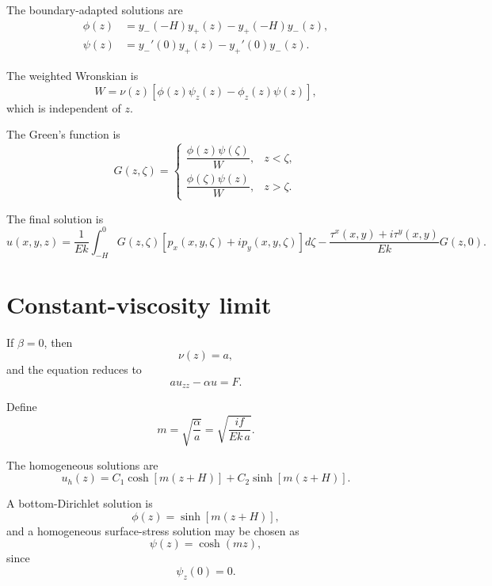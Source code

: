 \documentclass[10pt]{amsart}
\begin{document}
The boundary-adapted solutions are
\begin{align}
\phi(z)
&=
y_-(-H)y_+(z)-y_+(-H)y_-(z),
\\[0.5em]
\psi(z)
&=
y_-'(0)y_+(z)-y_+'(0)y_-(z).
\end{align}

The weighted Wronskian is
\begin{equation}
W
=
\nu(z)
\left[
\phi(z)\psi_z(z)-\phi_z(z)\psi(z)
\right],
\end{equation}
which is independent of \(z\).

The Green's function is
\begin{equation}
G(z,\zeta)
=
\begin{cases}
\dfrac{\phi(z)\psi(\zeta)}{W},
& z<\zeta,\\[1.2em]
\dfrac{\phi(\zeta)\psi(z)}{W},
& z>\zeta.
\end{cases}
\end{equation}

The final solution is
\begin{equation}
\boxed{
u(x,y,z)
=
\frac{1}{E k}
\int_{-H}^{0}
G(z,\zeta)
\left[
p_x(x,y,\zeta)+i p_y(x,y,\zeta)
\right]d\zeta
-
\frac{\tau^x(x,y)+i\tau^y(x,y)}{E k}
G(z,0).
}
\end{equation}

\section{Constant-viscosity limit}

If \(\beta=0\), then
\[
\nu(z)=a,
\]
and the equation reduces to
\begin{equation}
a u_{zz}-\alpha u=F.
\end{equation}

Define
\begin{equation}
m=\sqrt{\frac{\alpha}{a}}
=
\sqrt{\frac{i f}{E k\,a}}.
\end{equation}

The homogeneous solutions are
\begin{equation}
u_h(z)
=
C_1\cosh\!\left[m(z+H)\right]
+
C_2\sinh\!\left[m(z+H)\right].
\end{equation}

A bottom-Dirichlet solution is
\begin{equation}
\phi(z)
=
\sinh\!\left[m(z+H)\right],
\end{equation}
and a homogeneous surface-stress solution may be chosen as
\begin{equation}
\psi(z)
=
\cosh(mz),
\end{equation}
since
\[
\psi_z(0)=0.
\]
\end{document}
